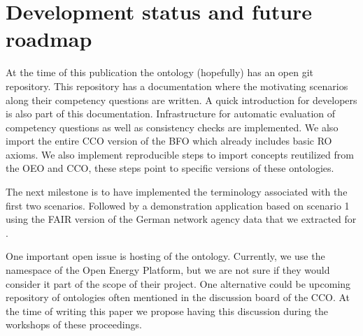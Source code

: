 \section{Development status and future roadmap}
\label{achievment}

At the time of this publication the ontology (hopefully) has an open git
repository. This repository has a documentation where the motivating scenarios
along their competency questions are written. A quick introduction for
developers is also part of this documentation. Infrastructure for automatic
evaluation of competency questions as well as consistency checks are
implemented. We also import the entire CCO version of the BFO which already
includes basic RO axioms. We also implement reproducible steps to import
concepts reutilized from the OEO and CCO, these steps point to specific
versions of these ontologies.

The next milestone is to have implemented the terminology associated with the
first two scenarios. Followed by a demonstration application based on scenario
1 using the FAIR version of the German network agency data that we extracted
for \cite{ArellanoRuiz.2024}.

One important open issue is hosting of the ontology. Currently, we use the
namespace of the Open Energy Platform, but we are not sure if they would
consider it part of the scope of their project. One alternative could be
upcoming repository of ontologies often mentioned in the discussion board of
the CCO. At the time of writing this paper we propose having this discussion
during the workshops of these proceedings.